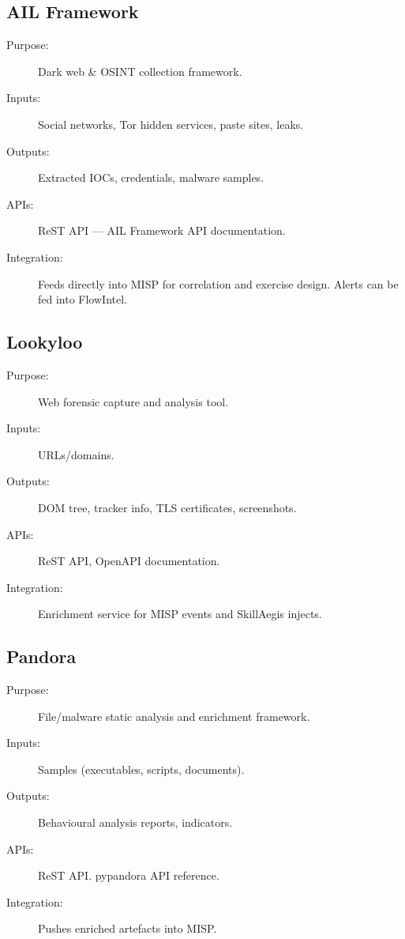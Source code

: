 \documentclass[10pt,a4paper]{report}
\begin{document}
\subsection{AIL Framework}
\begin{description}
  \item[Purpose:] Dark web \& OSINT collection framework.
  \item[Inputs:] Social networks, Tor hidden services, paste sites, leaks.
  \item[Outputs:] Extracted IOCs, credentials, malware samples.
  \item[APIs:] ReST API --- AIL Framework API documentation.
  \item[Integration:] Feeds directly into MISP for correlation and exercise
  design. Alerts can be fed into FlowIntel.
\end{description}

\subsection{Lookyloo}
\begin{description}
  \item[Purpose:] Web forensic capture and analysis tool.
  \item[Inputs:] URLs/domains.
  \item[Outputs:] DOM tree, tracker info, TLS certificates, screenshots.
  \item[APIs:] ReST API, OpenAPI documentation.
  \item[Integration:] Enrichment service for MISP events and SkillAegis
  injects.
\end{description}

\subsection{Pandora}
\begin{description}
  \item[Purpose:] File/malware static analysis and enrichment framework.
  \item[Inputs:] Samples (executables, scripts, documents).
  \item[Outputs:] Behavioural analysis reports, indicators.
  \item[APIs:] ReST API. pypandora API reference.
  \item[Integration:] Pushes enriched artefacts into MISP.
\end{description}
\end{document}
